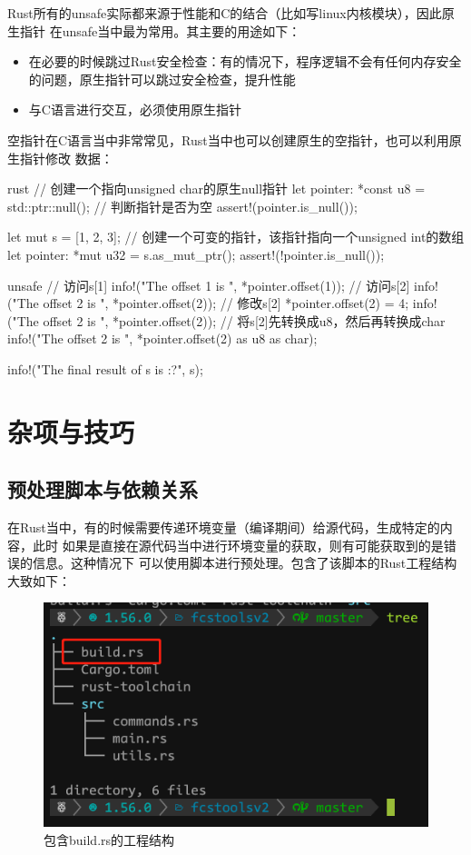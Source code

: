 Rust所有的unsafe实际都来源于性能和C的结合（比如写linux内核模块），因此原生指针
在unsafe当中最为常用。其主要的用途如下：
\begin{itemize}
  \item 在必要的时候跳过Rust安全检查：有的情况下，程序逻辑不会有任何内存安全的问题，原生指针可以跳过安全检查，提升性能
  \item 与C语言进行交互，必须使用原生指针
\end{itemize}

空指针在C语言当中非常常见，Rust当中也可以创建原生的空指针，也可以利用原生指针修改
数据：
\begin{code-block}{rust}
// 创建一个指向unsigned char的原生null指针
let pointer: *const u8 = std::ptr::null();
// 判断指针是否为空
assert!(pointer.is_null());

let mut s = [1, 2, 3];
// 创建一个可变的指针，该指针指向一个unsigned int的数组
let pointer: *mut u32 = s.as_mut_ptr();
assert!(!pointer.is_null());

unsafe {
    // 访问s[1]
    info!("The offset 1 is {}", *pointer.offset(1));
    // 访问s[2]
    info!("The offset 2 is {}", *pointer.offset(2));
    // 修改s[2]
    *pointer.offset(2) = 4;
    info!("The offset 2 is {}", *pointer.offset(2));
    // 将s[2]先转换成u8，然后再转换成char
    info!("The offset 2 is {}", *pointer.offset(2) as u8 as char);
}

info!("The final result of s is {:?}", s);
\end{code-block}

\section{杂项与技巧}

\subsection{预处理脚本与依赖关系}
在Rust当中，有的时候需要传递环境变量（编译期间）给源代码，生成特定的内容，此时
如果是直接在源代码当中进行环境变量的获取，则有可能获取到的是错误的信息。这种情况下
可以使用脚本进行预处理。包含了该脚本的Rust工程结构大致如下：
\begin{figure}[H]
  \centering
  \includegraphics[width=\linewidth]{rust_build_rs.png}
  \caption{包含build.rs的工程结构}
  \label{fig:rust_build_rs}
\end{figure}

